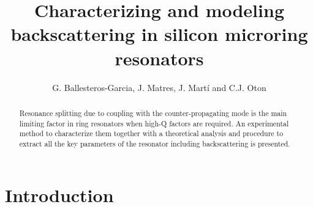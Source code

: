 \documentclass[10pt,letterpaper]{article}
\begin{document}
\title{Characterizing and modeling backscattering in silicon microring resonators}

\author{G. Ballesteros-Garcia, J. Matres, J. Mart\'i and C.J. Oton}

\address{Nanophotonics Technology Center, \\ Universidad Polit\'ecnica de Valencia, Camino de Vera s/n, 46022, Valencia, Spain}




\begin{abstract}
Resonance splitting due to coupling with the counter-propagating mode is the main limiting factor in ring resonators when high-Q factors are required. An experimental method to characterize them together with a theoretical analysis and procedure to extract all the key parameters of the resonator including backscattering is presented.
\end{abstract}





\section{Introduction}
\end{document}

